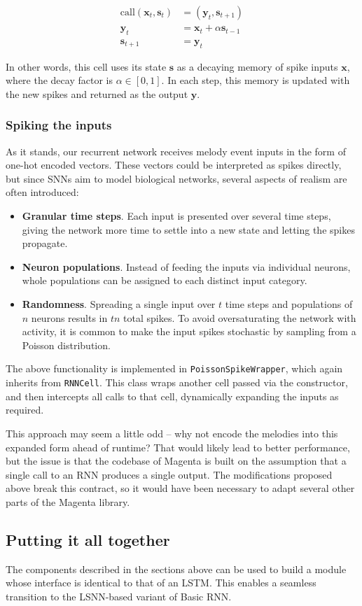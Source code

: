 \documentclass[../../report.tex]{subfiles}
\begin{document}
\begin{align}
  \mathrm{call}(\bm{x}_t, \bm{s}_t) &= (\bm{y}_t, \bm{s}_{t+1}) \\
  \bm{y}_t &= \bm{x}_t + \alpha\bm{s}_{t-1} \\
  \bm{s}_{t+1} &= \bm{y}_t
\end{align}

In other words, this cell uses its state \(\bm{s}\) as a decaying memory of
spike inputs \(\bm{x}\), where the decay factor is \(\alpha \in [0, 1]\). In
each step, this memory is updated with the new spikes and returned as the output
\(\bm{y}\).

\subsubsection{Spiking the inputs}
As it stands, our recurrent network receives melody event inputs in the form of
one-hot encoded vectors. These vectors could be interpreted as spikes directly,
but since SNNs aim to model biological networks, several aspects of realism are
often introduced:

\begin{itemize}
  \item \textbf{Granular time steps}. Each input is presented over several time
  steps, giving the network more time to settle into a new state and letting the
  spikes propagate.

  \item \textbf{Neuron populations}. Instead of feeding the inputs via
  individual neurons, whole populations can be assigned to each distinct input
  category.

  \item \textbf{Randomness}. Spreading a single input over \(t\) time steps and
  populations of \(n\) neurons results in \(tn\) total spikes. To avoid
  oversaturating the network with activity, it is common to make the input
  spikes stochastic by sampling from a Poisson distribution.
\end{itemize}

The above functionality is implemented in \texttt{PoissonSpikeWrapper}, which
again inherits from \texttt{RNNCell}. This class wraps another cell passed via
the constructor, and then intercepts all calls to that cell, dynamically
expanding the inputs as required.

This approach may seem a little odd -- why not encode the melodies into this
expanded form ahead of runtime? That would likely lead to better performance,
but the issue is that the codebase of Magenta is built on the assumption that a
single call to an RNN produces a single output. The modifications proposed above
break this contract, so it would have been necessary to adapt several other
parts of the Magenta library.

\subsection{Putting it all together}

The components described in the sections above can be used to build a module
whose interface is identical to that of an LSTM. This enables a seamless
transition to the LSNN-based variant of Basic RNN.

\end{document}
